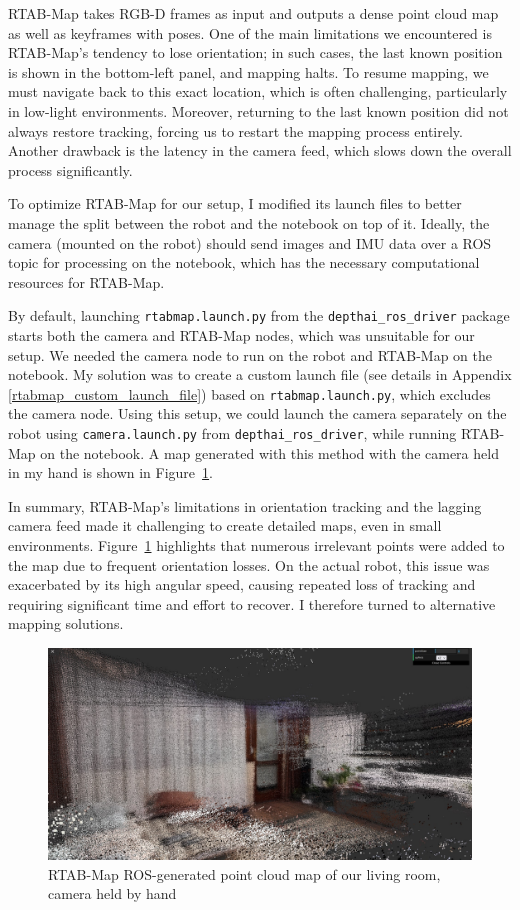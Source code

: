 RTAB-Map takes RGB-D frames as input and outputs a dense point cloud map as well as keyframes with poses.
One of the main limitations we encountered is RTAB-Map’s tendency to lose orientation; in such cases, the last known position is shown in the bottom-left panel, and mapping halts. To resume mapping, we must navigate back to this exact location, which is often challenging, particularly in low-light environments. Moreover, returning to the last known position did not always restore tracking, forcing us to restart the mapping process entirely. Another drawback is the latency in the camera feed, which slows down the overall process significantly.

To optimize RTAB-Map for our setup, I modified its launch files to better manage the split between the robot and the notebook on top of it. Ideally, the camera (mounted on the robot) should send images and IMU data over a ROS topic for processing on the notebook, which has the necessary computational resources for RTAB-Map.

By default, launching \verb|rtabmap.launch.py| from the \verb|depthai_ros_driver| package starts both the camera and RTAB-Map nodes, which was unsuitable for our setup. We needed the camera node to run on the robot and RTAB-Map on the notebook. My solution was to create a custom launch file (see details in Appendix \ref{rtabmap_custom_launch_file}) based on \verb|rtabmap.launch.py|, which excludes the camera node. Using this setup, we could launch the camera separately on the robot using \verb|camera.launch.py| from \verb|depthai_ros_driver|, while running RTAB-Map on the notebook. A map generated with this method with the camera held in my hand is shown in Figure~\ref{fig:rtabmap_nokia}.

In summary, RTAB-Map’s limitations in orientation tracking and the lagging camera feed made it challenging to create detailed maps, even in small environments. Figure~\ref{fig:rtabmap_nokia} highlights that numerous irrelevant points were added to the map due to frequent orientation losses. On the actual robot, this issue was exacerbated by its high angular speed, causing repeated loss of tracking and requiring significant time and effort to recover. I therefore turned to alternative mapping solutions.

\begin{figure}[htbp]
	\centering
	\includegraphics[width=150mm, keepaspectratio]{figures_jpg/rtabmap_ros_home.jpg}
	\caption{RTAB-Map ROS-generated point cloud map of our living room, camera held by hand}
	\label{fig:rtabmap_nokia}
\end{figure}

